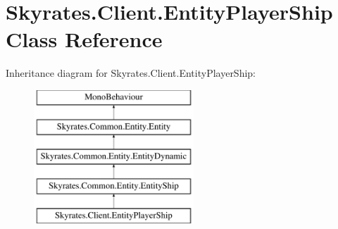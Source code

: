 \hypertarget{class_skyrates_1_1_client_1_1_entity_player_ship}{\section{Skyrates.\-Client.\-Entity\-Player\-Ship Class Reference}
\label{class_skyrates_1_1_client_1_1_entity_player_ship}
}
Inheritance diagram for Skyrates.\-Client.\-Entity\-Player\-Ship\-:\begin{figure}[H]
\begin{center}
\leavevmode
\includegraphics[height=5.000000cm]{class_skyrates_1_1_client_1_1_entity_player_ship}
\end{center}
\end{figure}
